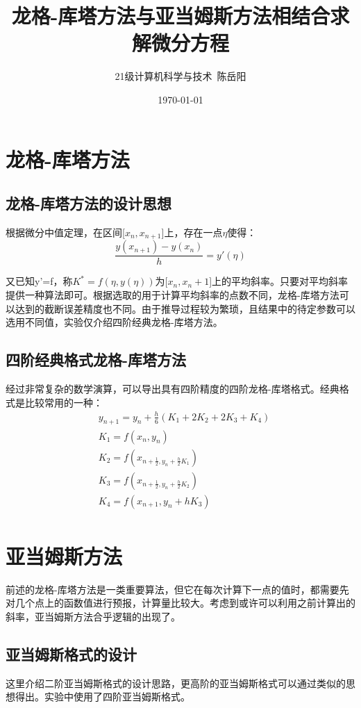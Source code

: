 \documentclass{article}
\title{龙格-库塔方法与亚当姆斯方法相结合求解微分方程}
\author{21级计算机科学与技术\ 陈岳阳}
\date{\today}
\begin{document}
\maketitle
\tableofcontents

\section{龙格-库塔方法}
  \subsection{龙格-库塔方法的设计思想}
根据微分中值定理，在区间[$x_n, x_{n+1}$]上，存在一点$\eta$使得：
$$
\frac{y(x_{n+1})-y(x_n)}{h}=y'(\eta)
$$

	又已知y'=f，称$K^*=f(\eta, y(\eta))$为[$x_n, x_n+1$]上的平均斜率。只要对平均斜率提供一种算法即可。根据选取的用于计算平均斜率的点数不同，龙格-库塔方法可以达到的截断误差精度也不同。由于推导过程较为繁琐，且结果中的待定参数可以选用不同值，实验仅介绍四阶经典龙格-库塔方法。
    
	\subsection{四阶经典格式龙格-库塔方法}
	经过非常复杂的数学演算，可以导出具有四阶精度的四阶龙格-库塔格式。经典格式是比较常用的一种：
$$
\begin{aligned}
&y_{n+1}=y_n+\frac{h}{6}(K_1+2K_2+2K_3+K_4)\\
&K_1=f(x_n, y_n)\\
&K_2=f(x_{n+\frac{1}{2}, y_n+\frac{h}{2}K_1})\\
&K_3=f(x_{n+\frac{1}{2}, y_n+\frac{h}{2}K_2})\\
&K_4=f(x_{n+1},y_n+hK_3)\\
\end{aligned}
$$

\section{亚当姆斯方法}
	前述的龙格-库塔方法是一类重要算法，但它在每次计算下一点的值时，都需要先对几个点上的函数值进行预报，计算量比较大。考虑到或许可以利用之前计算出的斜率，亚当姆斯方法合乎逻辑的出现了。
  \subsection{亚当姆斯格式的设计}
	这里介绍二阶亚当姆斯格式的设计思路，更高阶的亚当姆斯格式可以通过类似的思想得出。实验中使用了四阶亚当姆斯格式。
\end{document}
